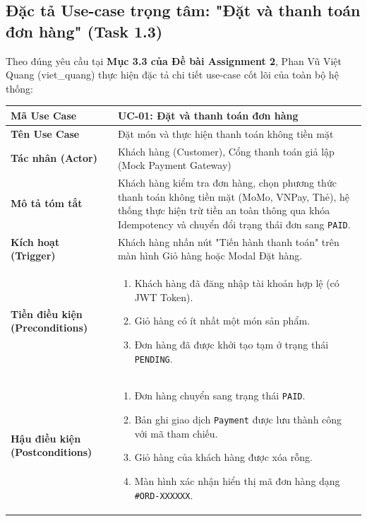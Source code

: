 \documentclass[a4paper]{article}
\begin{document}
\subsection{Đặc tả Use-case trọng tâm: "Đặt và thanh toán đơn hàng" (Task 1.3)}
Theo đúng yêu cầu tại \textbf{Mục 3.3 của Đề bài Assignment 2}, Phan Vũ Việt Quang (viet\_quang) thực hiện đặc tả chi tiết use-case cốt lõi của toàn bộ hệ thống:

\begin{table}[h!]
\centering
\small
\begin{tabular}{|p{3.5cm}|p{11.5cm}|}
\hline
\textbf{Mã Use Case} & \textbf{UC-01: Đặt và thanh toán đơn hàng} \\ \hline
\textbf{Tên Use Case} & Đặt món và thực hiện thanh toán không tiền mặt \\ \hline
\textbf{Tác nhân (Actor)} & Khách hàng (Customer), Cổng thanh toán giả lập (Mock Payment Gateway) \\ \hline
\textbf{Mô tả tóm tắt} & Khách hàng kiểm tra đơn hàng, chọn phương thức thanh toán không tiền mặt (MoMo, VNPay, Thẻ), hệ thống thực hiện trừ tiền an toàn thông qua khóa Idempotency và chuyển đổi trạng thái đơn sang \texttt{PAID}. \\ \hline
\textbf{Kích hoạt (Trigger)} & Khách hàng nhấn nút "Tiến hành thanh toán" trên màn hình Giỏ hàng hoặc Modal Đặt hàng. \\ \hline
\textbf{Tiền điều kiện (Preconditions)} & 
\begin{enumerate}
    \vspace{-0.2cm}
    \item Khách hàng đã đăng nhập tài khoản hợp lệ (có JWT Token).
    \item Giỏ hàng có ít nhất một món sản phẩm.
    \item Đơn hàng đã được khởi tạo tạm ở trạng thái \texttt{PENDING}.
    \vspace{-0.2cm}
\end{enumerate} \\ \hline
\textbf{Hậu điều kiện (Postconditions)} & 
\begin{enumerate}
    \vspace{-0.2cm}
    \item Đơn hàng chuyển sang trạng thái \texttt{PAID}.
    \item Bản ghi giao dịch \texttt{Payment} được lưu thành công với mã tham chiếu.
    \item Giỏ hàng của khách hàng được xóa rỗng.
    \item Màn hình xác nhận hiển thị mã đơn hàng dạng \texttt{\#ORD-XXXXXX}.

\end{enumerate}
\end{tabular}
\end{table}
\end{document}
